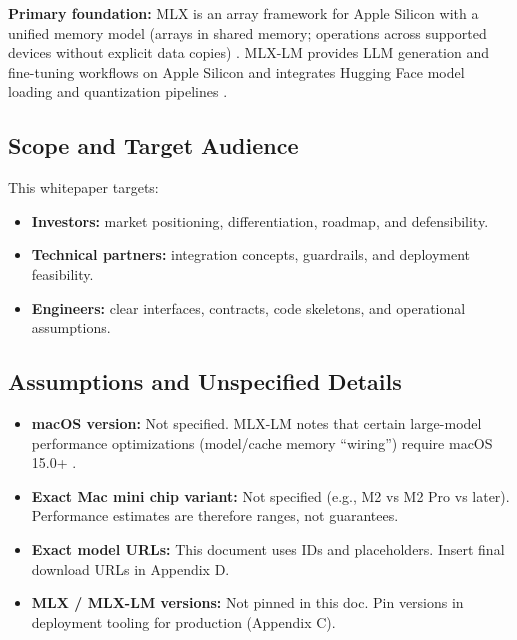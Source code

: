 \documentclass[11pt]{article}
\begin{document}
\begin{EngineeringBox}
\textbf{Primary foundation:} MLX is an array framework for Apple Silicon with a unified memory model (arrays in shared memory; operations across supported devices without explicit data copies) \cite{MLX_GitHub, MLX_Docs}.
MLX-LM provides LLM generation and fine-tuning workflows on Apple Silicon and integrates Hugging Face model loading and quantization pipelines \cite{MLXLM_Readme}.
\end{EngineeringBox}

\subsection{Scope and Target Audience}

This whitepaper targets:
\begin{itemize}
  \item \textbf{Investors:} market positioning, differentiation, roadmap, and defensibility.
  \item \textbf{Technical partners:} integration concepts, guardrails, and deployment feasibility.
  \item \textbf{Engineers:} clear interfaces, contracts, code skeletons, and operational assumptions.
\end{itemize}

\subsection{Assumptions and Unspecified Details}

\begin{AssumptionsBox}
\begin{itemize}
  \item \textbf{macOS version:} Not specified. MLX-LM notes that certain large-model performance optimizations (model/cache memory ``wiring'') require macOS 15.0+ \cite{MLXLM_Readme}.
  \item \textbf{Exact Mac mini chip variant:} Not specified (e.g., M2 vs M2 Pro vs later). Performance estimates are therefore ranges, not guarantees.
  \item \textbf{Exact model URLs:} This document uses IDs and placeholders. Insert final download URLs in Appendix D.
  \item \textbf{MLX / MLX-LM versions:} Not pinned in this doc. Pin versions in deployment tooling for production (Appendix C).
\end{itemize}
\end{AssumptionsBox}
\end{document}
